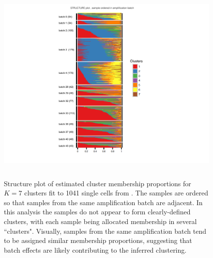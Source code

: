 \begin{figure}[ht]
\centering
\includegraphics[height=4in, width=5.5in]{../plots/jaitin-figures/jaitin-amplification-2016-02-26.pdf}
\caption{Structure plot of estimated cluster membership proportions for $K=7$ clusters fit to 1041 single cells from \cite{Jaitin2014}. The samples are ordered so that samples from the same amplification batch are adjacent. In this analysis the samples do not appear to form clearly-defined clusters, with each sample being allocated membership in several ``clusters". Visually, samples from the same amplification batch tend to be assigned similar membership proportions, suggesting that batch effects are likely contributing to the inferred clustering.}
\label{fig:fig3}
\end{figure}



